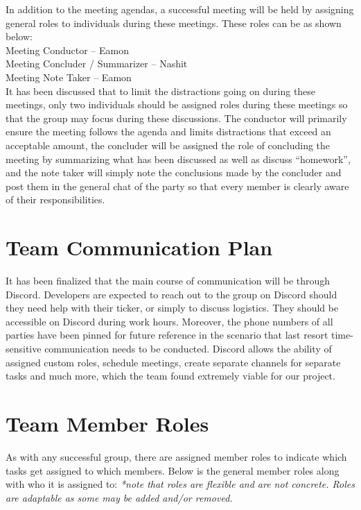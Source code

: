 \documentclass[12pt,a4]{report}
\begin{document}
In addition to the meeting agendas, a successful meeting will be held by assigning general roles to individuals during these meetings. These roles can be as shown below:\\

\noindent Meeting Conductor – Eamon\\
Meeting Concluder / Summarizer – Nashit\\
Meeting Note Taker – Eamon\\

It has been discussed that to limit the distractions going on during these meetings, only two individuals should be assigned roles during these meetings so that the group may focus during these discussions. The conductor will primarily ensure the meeting follows the agenda and limits distractions that exceed an acceptable amount, the concluder will be assigned the role of concluding the meeting by summarizing what has been discussed as well as discuss “homework”, and the note taker will simply note the conclusions made by the concluder and post them in the general chat of the party so that every member is clearly aware of their responsibilities. 

\section*{Team Communication Plan}
It has been finalized that the main course of communication will be through Discord. Developers are expected to reach out to the group on Discord should they need help with their ticker, or simply to discuss logistics. They should be accessible on Discord during work hours. Moreover, the phone numbers of all parties have been pinned for future reference in the scenario that last resort time-sensitive communication needs to be conducted. Discord allows the ability of assigned custom roles, schedule meetings, create separate channels for separate tasks and much more, which the team found extremely viable for our project. 

\section*{Team Member Roles}
As with any successful group, there are assigned member roles to indicate which tasks get assigned to which members. Below is the general member roles along with who it is assigned to: \emph{*note that roles are flexible and are not concrete. Roles are adaptable as some may be added and/or removed.}\\
\end{document}
